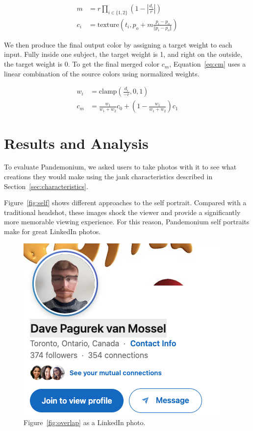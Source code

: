 \documentclass[twocolumn]{article}
\begin{document}
\begin{align}
    \label{eq:mag}
    m &= r \prod_{i\in\{1,2\}}\left(1 - \left\vert \frac{d_i}{r} \right\vert\right) \\
    \label{eq:ci}
    c_i &= \text{texture}\left(t_i, p_o + m\frac{p_i-p_o}{\Vert p_i-p_o\Vert}\right)
\end{align}

We then produce the final output color by assigning a target weight to each input. Fully inside one subject, the target weight is 1, and right on the outside, the target weight is 0. To get the final merged color $c_m$, Equation~\ref{eq:cm} uses a linear combination of the source colors using normalized weights.

\begin{align}
    w_i &= \text{clamp}\left(\frac{d_i}{-r}, 0, 1\right) \\
    \label{eq:cm}
    c_m &= \frac{w_1}{w_1 + w_2}c_0 + \left(1 - \frac{w_1}{w_1 + w_2}\right)c_1
\end{align}

\section{Results and Analysis}

To evaluate Pandemonium, we asked users to take photos with it to see what creations they would make using the jank characteristics described in Section~\ref{sec:characteristics}.

Figure~\ref{fig:self} shows different approaches to the self portrait. Compared with a traditional headshot, these images shock the viewer and provide a significantly more memorable viewing experience. For this reason, Pandemonium self portraits make for great LinkedIn photos.

\begin{figure}
    \centering
    \includegraphics[width=0.98\linewidth]{img/linkedin-zoom.png}
    \caption{Figure~\ref{fig:overlap} as a LinkedIn photo.}
    \label{fig:linkedin}
\end{figure}
\end{document}
